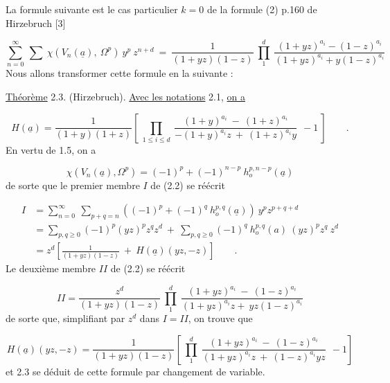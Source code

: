 La formule suivante est le cas particulier $k = 0$ de la formule (2) p.160 de Hirzebruch [3] 



\begin{equation}\tag{2.2}
\sum_{n=0}^{\infty}\ \sum\ \chi(V_n(\underline{a}),\ \Omega^p)\ y^p\ z^{n+d}\ =\ \frac{1}{(1+yz)(1-z)}\ \prod_{1}^{d}\ \frac{(1+yz)^{a_i}-(1-z)^{a_i}}{(1+yz)^{a_i}+y(1-z)^{a_i}}
\end{equation}
Nous allons transformer cette formule en la suivante :

\underline{Théorème} 2.3. (Hirzebruch). \underline{Avec les notations} 2.1, \underline{on a}

\begin{equation*}
H(\underline{a}) = \frac{1}{(1+y)(1+z)}\left[\ \prod_{1\leq i\leq d}\ \frac{(1+y)^{a_i}\ -\ (1+z)^{a_i}}{-(1+y)^{a_i}z\ +\ (1+z)^{a_i}y}\ \ -1\ \right] \qquad .
\end{equation*}
En vertu de 1.5, on a

\begin{equation*}
\chi(V_n(\underline{a}),\Omega^p) = (-1)^p + (-1)^{n-p}\ h_o^{p,n-p}(\underline{a})
\end{equation*}
de sorte que le premier membre $I$ de (2.2) se réécrit

\begin{equation*}
\begin{aligned}
I &= \sum_{n=0}^{\infty}\ \sum_{p+q=n} ((-1)^p+(-1)^q\ h_o^{p,q}(\underline{a}))\ y^p z^{p+q+d}\\
&= \sum_{p,q\geq 0} (-1)^p(yz)^p z^q z^d\ +\ \sum_{p,q\geq 0} (-1)^q\ h_o^{p,q}(a)\ (yz)^p z^q\ z^d\\
&= z^d\left[\frac{1}{(1+yz)(1-z)}\ +\ H(\underline{a})(yz,-z)\right] \qquad .
\end{aligned}
\end{equation*}
Le deuxième membre $II$ de (2.2) se réécrit

\begin{equation*}
II = \frac{z^d}{(1+yz)(1-z)}\ \prod_{1}^{d}\ \frac{(1+yz)^{a_i}\ -\ (1-z)^{a_i}}{(1+yz)^{a_i}z+\ yz(1-z)^{a_i}}
\end{equation*}
de sorte que, simplifiant par $z^d$ dans $I = II$, on trouve que

\begin{equation*}
H(\underline{a})(yz,-z) = \frac{1}{(1+yz)(1-z)}\left[\ \prod_{1}^{d}\ \frac{(1+yz)^{a_i}\ -\ (1-z)^{a_i}}{(1+yz)^{a_i}z\ +\ (1-z)^{a_i}yz}\ \ -1\right]
\end{equation*}
et 2.3 se déduit de cette formule par changement de variable.


